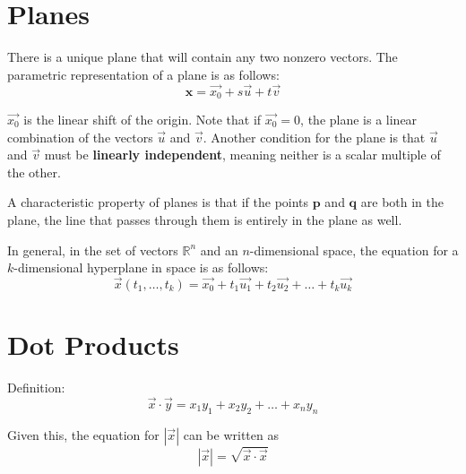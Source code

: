 \documentclass[11pt]{article}
\begin{document}
\section{Planes}
	There is a unique plane that will contain any two nonzero vectors. The parametric representation of a plane is as follows:
	\begin{equation}
		\mathbf{x} = \vec{x_0} + s\vec{u} + t\vec{v}
	\end{equation}
	
	$\vec{x_0}$ is the linear shift of the origin. Note that if $\vec{x_0} = 0$, the plane is a linear combination of the vectors $\vec{u}$ and $\vec{v}$. Another condition for the plane is that $\vec{u}$ and $\vec{v}$ must be \textbf{linearly independent}, meaning neither is a scalar multiple of the other.
	
	A characteristic property of planes is that if the points $\mathbf{p}$ and $\mathbf{q}$ are both in the plane, the line that passes through them is entirely in the plane as well.
	
	In general, in the set of vectors $\mathbb{R}^n$ and an $n$-dimensional space, the equation for a $k$-dimensional hyperplane in space is as follows:
	\begin{equation}
		\vec{x}(t_1,\ldots ,t_k) = \vec{x_0} + t_1\vec{u_1} + t_2\vec{u_2} + \ldots + t_k\vec{u_k}
	\end{equation}
	
\section{Dot Products}
	Definition:
	\begin{equation}
		\vec{x} \cdot \vec{y} = x_1y_1 + x_2y_2 + \ldots + x_ny_n
	\end{equation}
	
	Given this, the equation for $|\vec{x}|$ can be written as
	\begin{equation}
		|\vec{x}| = \sqrt{\vec{x}\cdot\vec{x}}
	\end{equation}
	
\end{document}
